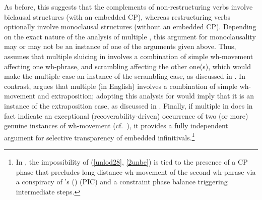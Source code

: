 \documentclass[output=paper]{langsci/langscibook}
\newcommand{\scite}[2]{\citeauthor{#2}#1 (\citeyear{#2})}
\begin{document}
\ea\label{ex:4} 
    \z
\z

\largerpage[-1]
As before, this suggests that the complements of non-restructuring verbs
involve biclausal structures (with an embedded CP), whereas  restructuring
verbs optionally involve monoclausal structures (without an embedded CP).
Depending on the exact nature of the analysis of multiple , this
argument for monoclausality may or may not be an instance of one of the
arguments given above. Thus, \cite{Sauerland:99:loc} assumes that multiple
sluicing in  involves a combination of simple wh-movement affecting one
wh-phrase, and scrambling affecting the other one(s), which would make the
multiple  case an instance of the scrambling case, as discussed in
. In contrast, \cite{Lasnik:14:mul} argues that multiple  (in
English) involves a combination of simple wh-movement and extraposition;
adopting this analysis for  would imply that it is an instance of the
extraposition case, as discussed in .  Finally, if multiple 
in  does in fact indicate an exceptional (recoverability-driven)
occurrence of two (or more) genuine instances of wh-movement (cf.\
\citealt{Merchant2001,Heck&Mueller:03:vers}), it provides a fully
independent argument for selective transparency of embedded
infinitivals.\footnote{In \citet{Heck&Mueller:03:vers}, the impossibility of
    (\ref{unlod28}, \ref{2unbe}) is tied to the presence of a CP phase that
    precludes long-distance wh-movement of the second wh-phrase via a
    conspiracy of \scite{'s}{Chomsky2001} 
(\glsunset{PIC}\gls{PIC}) and a constraint phase balance triggering
intermediate \isi{movement} steps.}
\end{document}

